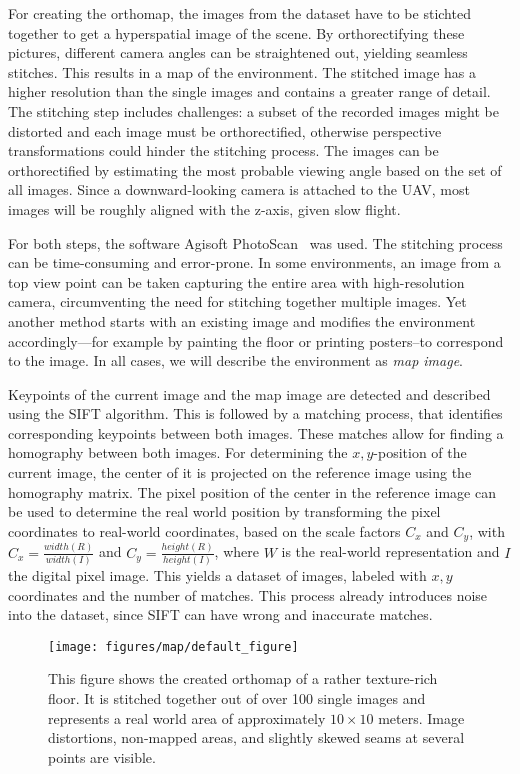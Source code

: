 For creating the orthomap, the images from the dataset have to be stichted
together to get a hyperspatial image of the scene. By orthorectifying
these pictures, different camera angles can be straightened out,
yielding seamless stitches. This results in a map of the
environment. The stitched image has a higher resolution than the
single images and contains a greater range of detail. The stitching
step includes challenges: a subset of the recorded images might be
distorted and each image must be orthorectified, otherwise perspective
transformations could hinder the stitching process. The images can be
orthorectified by estimating the most probable viewing angle based on
the set of all images. Since a downward-looking camera is attached to
the UAV, most images will be roughly aligned with the z-axis, given
slow flight.

For both steps, the software Agisoft
PhotoScan~\cite{agisoft2013agisoft} was used. The stitching process
can be time-consuming and error-prone. In some environments, an image
from a top view point can be taken capturing the entire area with
high-resolution camera, circumventing the need for stitching together
multiple images. Yet another method starts with an existing image and
modifies the environment accordingly---for example by painting the
floor or printing posters--to correspond to the image. In all cases,
we will describe the environment as \emph{map image}. 

Keypoints of the current image and the map image are detected and
described using the SIFT algorithm. This is followed by a matching
process, that identifies corresponding keypoints between both
images. These matches allow for finding a homography between both
images. For determining the $x, y$-position of the current image, the
center of it is projected on the reference image using the homography
matrix. The pixel position of the center in the reference image can be
used to determine the real world position by transforming the pixel
coordinates to real-world coordinates, based on the scale factors
$C_x$ and $C_y$, with $C_x = \frac{width(R)}{width(I)}$ and
$C_y = \frac{height(R)}{height(I)}$, where $W$ is the real-world
representation and $I$ the digital pixel image. This yields a dataset
of images, labeled with $x, y$ coordinates and the number of
matches. This process already introduces noise into the dataset, since
SIFT can have wrong and inaccurate matches.

\begin{figure}[h!]
\begin{center}
\texttt{[image: figures/map/default\_figure]}
\caption{{\label{fig:orthomap} This figure shows
    the created orthomap of a rather texture-rich floor. It is
    stitched together out of over 100 single images and represents a
    real world area of approximately $10\times10$ meters. Image
    distortions, non-mapped areas, and slightly skewed seams at
    several points are visible.%
}}
\end{center}
\end{figure}

